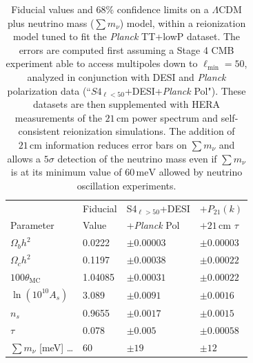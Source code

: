 \documentclass[twocolumn,aps,prd,nofootinbib,showpacs,superscriptaddress]{revtex4-1}
\begin{document}
\begin{table}
\caption{\label{tab:S4CosmoParams} Fiducial values and $68\%$ confidence limits on a $\Lambda$CDM plus neutrino mass ($\sum m_\nu$) model, within a reionization model tuned to fit the \emph{Planck} TT+lowP dataset. The errors are computed first assuming a Stage 4 CMB experiment able to access multipoles down to $\ell_\textrm{min} = 50$, analyzed in conjunction with DESI and \emph{Planck} polarization data (``$S4_{\ell < 50}$+DESI+\emph{Planck} Pol"). These datasets are then supplemented with HERA measurements of the $21\,\textrm{cm}$ power spectrum and self-consistent reionization simulations. The addition of $21\,\textrm{cm}$ information reduces error bars on $\sum m_\nu$ and allows a $5\sigma$ detection of the neutrino mass even if $\sum m_\nu$ is at its minimum value of $60\,\textrm{meV}$ allowed by neutrino oscillation experiments.}
\begin{ruledtabular}
\begin{tabular}{llll}
 & Fiducial & S4$_{\ell > 50}$+DESI & $+P_{21} (k)$ \\
Parameter & Value & +\emph{Planck} Pol& $+21\,\textrm{cm}$ $\tau$ \\
\hline
$\Omega_b h^2$ \dotfill & 0.0222 & $\pm 0.00003$ & $\pm 0.00003$ \\
$\Omega_c h^2$ \dotfill  & 0.1197 &$\pm 0.00038$ & $\pm 0.00022$\\
$100 \theta_\textrm{MC}$ \dotfill  & 1.04085 &$\pm 0.00031 $ & $\pm 0.00022 $\\
$\ln ( 10^{10} A_s) $ \dotfill  & 3.089 & $\pm0.0091 $ & $\pm0.0016 $\\
$n_s$ \dotfill  & 0.9655 & $\pm 0.0017 $ & $\pm 0.0015$\\
$\tau$ \dotfill  & 0.078  & $\pm 0.005 $ & $\pm 0.00058$ \\
$\sum m_\nu$ [meV] \dots & 60 & $\pm 19$ & $\pm12 $\\
\end{tabular}
\end{ruledtabular}
\end{table}
\end{document}

